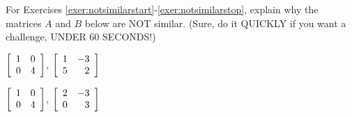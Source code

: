 \noindent For Exercises \ref{exer:notsimilarstart}-\ref{exer:notsimilarstop}, explain why the matrices $A$ and $B$ below are NOT similar. (Sure, do it QUICKLY if you want a challenge, UNDER 60 SECONDS!)
\begin{enumerate}[!HW!, label=$\spadesuit$ \arabic*., ref=\arabic*]
\begin{multicols}{2}
\item\label{exer:notsimilarstart} $\mtx{rr}{1&0\\0&4}$, $\mtx{rr}{1&-3\\5&2}$ 
\item\label{exer:notsimilarstop} $\mtx{rr}{1&0\\0&4}$, $\mtx{rr}{2&-3\\0&3}$
\end{multicols}
\end{enumerate}


 \mbox{}\vfill
 
\pagebreak